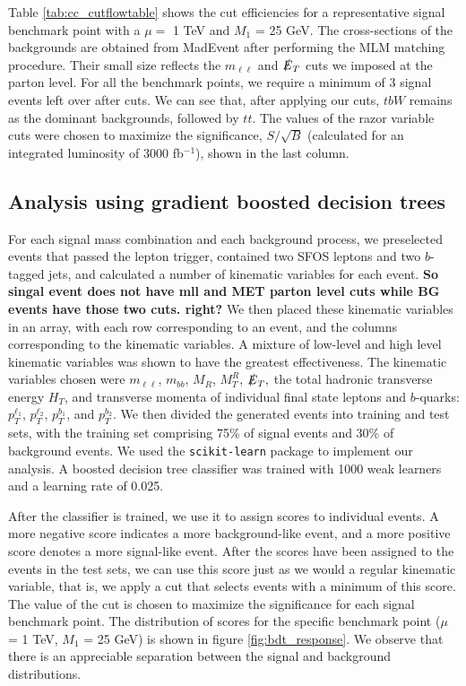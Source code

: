 \documentclass[a4paper,11pt]{article}
\newcommand{\Shufang}[1]{{\bf\color{Maroon}  #1}}
\begin{document}
Table \ref{tab:cc_cutflowtable} shows the cut efficiencies for a representative
signal benchmark point with a $\mu =$ 1 TeV and $M_1$ = 25 GeV.   The
cross-sections of the backgrounds are obtained from MadEvent after performing the MLM matching procedure. Their small size reflects
the $m_{\ell\ell}$ and $\slashed{E}_T$ cuts we imposed at the parton level. For all
the benchmark points, we require a minimum of 3 signal events left over after
cuts. We can see that, after applying our cuts, $tbW$ remains as the
dominant backgrounds, followed by $tt$.   The values of the razor variable cuts were chosen to
maximize the significance, $S/\sqrt{B}$ (calculated for an integrated luminosity
of 3000 fb$^{-1}$), shown in the last column.  

\subsection{Analysis using gradient boosted decision trees}\label{subsec:bdt}

For each signal mass combination and each background process, we preselected
events that passed the lepton trigger, contained two SFOS leptons and two
$b$-tagged jets, and calculated a number of kinematic variables for each event.
  \Shufang{So singal event does not have mll and MET parton level cuts while BG events have those two cuts. right?}   We then
placed these kinematic variables in an array, with each row corresponding to an
event, and the columns corresponding to the kinematic variables. A mixture of
low-level and high level kinematic variables was shown to have the greatest
effectiveness. The kinematic variables chosen were $m_{\ell\ell}$, $m_{bb}$,
$M_R$, $M_T^R$, $\slashed{E}_T,$ the total hadronic transverse energy $H_T$,
and transverse momenta of individual final state leptons and $b$-quarks:
$p_T^{\ell_1}$, $p_T^{\ell_2}$, $p_T^{b_1}$, and $p_T^{b_2}$. We then divided
the generated events into training and test sets, with the training set
comprising 75\% of signal events and 30\% of background events.  We used the
\texttt{scikit-learn} package  \cite{Pedregosa2011} to implement our analysis.
A boosted decision tree classifier was trained with 1000 weak learners and a
learning rate of 0.025.  

After the classifier is trained, we use it to assign scores to individual
events. A more negative score indicates a more background-like event, and a
more positive score denotes a more signal-like event. After the scores have
been assigned to the events in the test sets, we can use this score just as we
would a regular kinematic variable, that is, we apply a cut that selects
events with a minimum of this score. The value of the cut is chosen to maximize
the significance for each signal benchmark point. The distribution of scores
for the specific benchmark point ($\mu$ = 1 TeV, $M_1$ = 25 GeV) is shown in
figure \ref{fig:bdt_response}. We observe that there is an appreciable
separation between the signal and background distributions.
\end{document}
